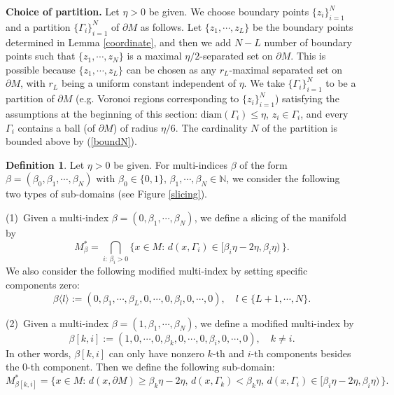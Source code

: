 \documentclass[11pt,letterpaper]{amsart}
\numberwithin{equation}{section}
\theoremstyle{definition}
\theoremstyle{plain}
\theoremstyle{definition}
\theoremstyle{plain}
\theoremstyle{definition}
\newtheorem{def-section5}[volume]{Definition}
\theoremstyle{plain}
\begin{document}
\smallskip
\noindent \textbf{Choice of partition.}
Let $\eta>0$ be given. We choose boundary points $\{z_i\}_{i=1}^N$ and a partition $\{\Gamma_i\}_{i=1}^N$ of $\partial M$ as follows. Let $\{z_1,\cdots,z_L\}$ be the boundary points determined in Lemma \ref{coordinate}, and then we add $N-L$ number of boundary points such that $\{z_{1},\cdots,z_{N}\}$ is a maximal $\eta/2$-separated set on $\partial M$. This is possible 
because $\{z_1,\cdots,z_L\}$ can be chosen as any $r_L$-maximal separated set on $\partial M$, with $r_L$ being a uniform constant independent of $\eta$.
We take $\{\Gamma_i\}_{i=1}^N$ to be a partition of $\partial M$ (e.g. Voronoi regions corresponding to $\{z_i\}_{i=1}^N$) satisfying the assumptions at the beginning of this section: $\textrm{diam}(\Gamma_i)\leqslant \eta$, $z_i\in \Gamma_i$, and every $\Gamma_i$ contains a ball (of $\partial M$) of radius $\eta/6$. The cardinality $N$ of the partition is bounded above by (\ref{boundN}).


\begin{def-section5}\label{Def-Mbeta}
Let $\eta>0$ be given. For multi-indices $\beta$ of the form $\beta=(\beta_0,\beta_1,\cdots,\beta_N)$ with $\beta_0\in\{0,1\},\,\beta_1,\cdots,\beta_N \in\mathbb{N}$, we consider the following two types of sub-domains (see Figure \ref{slicing}).

\smallskip
(1) \,Given a multi-index $\beta=(0,\beta_1,\cdots,\beta_N)$, we define a slicing of the manifold by
\begin{equation}\label{Mbeta}
M_{\beta}^{\ast}=\bigcap_{i:\,\beta_i>0} \big\{x\in M: \, d(x,\Gamma_i)\in [\beta_i\eta-2\eta,\beta_i\eta) \,\big\}.
\end{equation}
We also consider the following modified multi-index by setting specific components zero: 
$$\beta\langle l\rangle:=(0,\beta_1,\cdots,\beta_L,0,\cdots,0,\beta_l,0,\cdots,0),\quad l\in \{L+1,\cdots,N\}.$$

(2) \,Given a multi-index $\beta=(1,\beta_1,\cdots,\beta_N)$, we define a modified multi-index by
$$\beta[k,i]:=(1,0,\cdots,0, \beta_k,0,\cdots,0,\beta_i,0,\cdots,0),\quad k\neq i.$$
In other words, $\beta[k,i]$ can only have nonzero $k$-th and $i$-th components besides the $0$-th component. Then we define the following sub-domain:
\begin{equation}\label{Mki}
M_{\beta[k,i]}^{\ast}=\big\{x\in M: \, d(x,\partial M)\geqslant \beta_k\eta-2\eta,\, d(x,\Gamma_k)<\beta_k\eta,\, d(x,\Gamma_i)\in [\beta_i\eta-2\eta,\beta_i\eta)\, \big\}.
\end{equation}
\end{def-section5}
\end{document}

